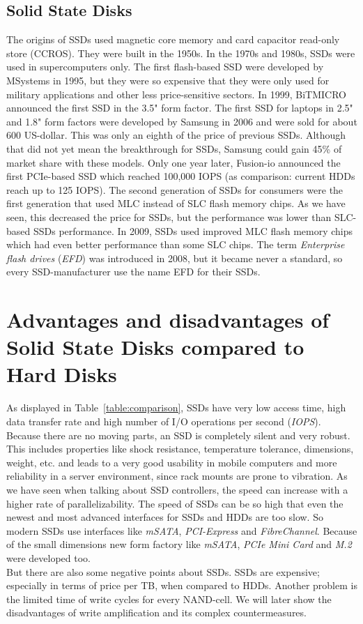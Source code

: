 \documentclass{acm_proc_article-sp}
\begin{document}
\subsection{Solid State Disks}
The origins of SSDs used magnetic core memory and card capacitor read-only store (CCROS). They were built in the 1950s. In the 1970s and 1980s, SSDs were used in supercomputers only. The first flash-based SSD were developed by MSystems in 1995, but they were so expensive that they were only used for military applications and other less price-sensitive sectors. In 1999, BiTMICRO announced the first SSD in the 3.5" form factor. The first SSD for laptops in 2.5" and 1.8" form factors were developed by Samsung in 2006 and were sold for about 600 US-dollar. This was only an eighth of the price of previous SSDs. Although that did not yet mean the breakthrough for SSDs, Samsung could gain 45\% of market share with these models. Only one year later, Fusion-io announced the first PCIe-based SSD which reached 100,000 IOPS (as comparison: current HDDs reach up to 125 IOPS). The second generation of SSDs for consumers were the first generation that used MLC instead of SLC flash memory chips. As we have seen, this decreased the price for SSDs, but the performance was lower than SLC-based SSDs performance. In 2009, SSDs used improved MLC flash memory chips which had even better performance than some SLC chips. The term \emph{Enterprise flash drives} (\emph{EFD}) was introduced in 2008, but it became never a standard, so every SSD-manufacturer use the name EFD for their SSDs.

{
\section{Advantages and disadvantages of Solid State Disks compared to Hard Disks}
}
As displayed in Table~\ref{table:comparison}, SSDs have very low access time, high data transfer rate and high number of I/O operations per second (\emph{IOPS}). Because there are no moving parts, an SSD is completely silent and very robust. This includes properties like shock resistance, temperature tolerance, dimensions, weight, etc. and leads to a very good usability in mobile computers and more reliability in a server environment, since rack mounts are prone to vibration. As we have seen when talking about SSD controllers, the speed can increase with a higher rate of parallelizability. The speed of SSDs can be so high that even the newest and most advanced interfaces for SSDs and HDDs are too slow. So modern SSDs use interfaces like \emph{mSATA}, \emph{PCI-Express} and \emph{FibreChannel}. Because of the small dimensions new form factory like \emph{mSATA}, \emph{PCIe Mini Card} and \emph{M.2} were developed too.
\\
But there are also some negative points about SSDs. SSDs are expensive; especially in terms of price per TB, when compared to HDDs. Another problem is the limited time of write cycles for every NAND-cell. We will later show the disadvantages of write amplification and its complex countermeasures.
\end{document}
